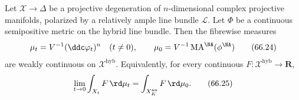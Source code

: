 \begin{theorem}\label{thm:hybrid-ma-continuity}
Let $\mathcal X\to\Delta$ be a projective degeneration of $n$-dimensional complex projective manifolds, polarized by a relatively ample line bundle $\mathcal L$. Let $\Phi$ be a continuous semipositive metric on the hybrid line bundle. Then the fibrewise measures
\[
        \mu_t=V^{-1}(\ddc\varphi_t)^n
        \quad(t\neq0),
        \qquad
        \mu_0=V^{-1}\operatorname{MA}^{\NA}(\phi^{\NA})
\tag{66.24}\label{eq:hybrid-ma-family}
\]
are weakly continuous on $\mathcal X^{\mathrm{hyb}}$. Equivalently, for every continuous $F:\mathcal X^{\mathrm{hyb}}\to\mathbf R$,
\[
              \lim_{t\to0}\int_{X_t}F\,\rd \mu_t
                    =\int_{X_K^{\mathrm{an}}}F\,\rd \mu_0.
\tag{66.25}\label{eq:hybrid-ma-test}
\]
\end{theorem}

